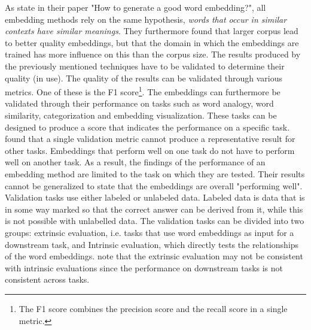 \documentclass[../../Thesis.tex]{subfiles}
\begin{document}
As \citet{lai2016generate} state in their paper "How to generate a good word embedding?", all embedding methods rely on the same hypothesis, \textit{words that occur in similar contexts have similar meanings}. They furthermore found that larger corpus lead to better quality embeddings, but that the domain in which the embeddings are trained has more influence on this than the corpus size. 
The results produced by the previously mentioned techniques have to be validated to determine their quality (in use). The quality of the results can be validated through various metrics. One of these is the F1 score\footnote{The F1 score combines the precision score and the recall score in a single metric.}. The embeddings can furthermore be validated through their performance on tasks such as word analogy, word similarity, categorization and embedding visualization. These tasks can be designed to produce a score that indicates the performance on a specific task. \citet{schnabel2015evaluation} found that a single validation metric cannot produce a representative result for other tasks. Embeddings that perform well on one task do not have to perform well on another task. As a result, the findings of the performance of an embedding method are limited to the task on which they are tested. Their results cannot be generalized to state that the embeddings are overall "performing well". Validation tasks use either labeled or unlabeled data. Labeled data is data that is in some way marked so that the correct answer can be derived from it, while this is not possible with unlabelled data. The validation tasks can be divided into two groups: extrinsic evaluation, i.e. tasks that use word embeddings as input for a downstream task, and Intrinsic evaluation, which directly tests the relationships of the word embeddings. \citet{schnabel2015evaluation} note that the extrinsic evaluation may not be consistent with intrinsic evaluations since the performance on downstream tasks is not consistent across tasks.
\clearpage
\end{document}
